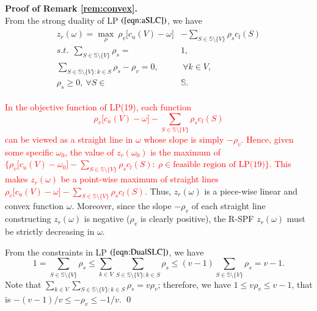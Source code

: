 \documentclass[authoryear,review,12pt]{elsarticle}
\begin{document}
\noindent \textbf{Proof of Remark \ref{rem:convex}.}\\
From the strong duality of LP $(\ref{eqn:aSLC})$, we have
\begin{eqnarray}\label{eqn:DualSLC}
\begin{aligned}
z_r(\omega) = \max_{\rho}~ \rho_v \big[ c_u(V)-\omega \big] &- \sum_{S \in \mathbb{S} \setminus \{V\}} \rho_s c_l(S)\\
s.t.~~\sum_{S \in \mathbb{S} \setminus \{V\}} \rho_s = &1,\\
\sum_{S \in \mathbb{S} \setminus \{V\}: k \in S} \rho_s - \rho_v = 0,&~\forall k \in V,\\
\rho_s \geq 0,~\forall S \in& \mathbb{S}.
\end{aligned}
\end{eqnarray}

\textcolor{red}{
In the objective function of LP(19), each function
$$\rho_v \big[ c_u(V)-\omega \big] - \sum_{S \in \mathbb{S} \setminus \{V\}} \rho_s c_l(S)$$
can be viewed as a straight line in $\omega$ whose slope is simply $-\rho_v$.
Hence, given some specific $\omega_0$, the value of $z_r(\omega_0)$ is the maximum of $\big\{\rho_v \big[ c_u(V)-\omega_0 \big] - \sum_{S \in \mathbb{S} \setminus \{V\}} \rho_s c_l(S):~\rho \in \text{feasible region of LP(19)} \big\}$.
This makes $z_r(\omega)$ be a point-wise maximum of straight lines $\rho_v \big[ c_u(V)-\omega \big] - \sum_{S \in \mathbb{S} \setminus \{V\}} \rho_s c_l(S)$.}
Thus, $z_r(\omega)$ is a piece-wise linear and convex function  $\omega$.
Moreover, since the slope $-\rho_v$ of each straight line constructing $z_r(\omega)$ is negative ($\rho_v$ is clearly positive), the R-SPF $z_r(\omega)$ must be strictly decreasing in $\omega$.

From the constraints in LP $(\ref{eqn:DualSLC})$, we have
$$
1 = \sum_{S \in \mathbb{S} \setminus \{V\}} \rho_s \leq \sum_{k \in V}\sum_{S \in \mathbb{S} \setminus \{V\}: k \in S} \rho_s \leq (v-1)\sum_{S \in \mathbb{S} \setminus \{V\}} \rho_s = v-1.
$$
Note that $\sum_{k \in V}\sum_{S \in \mathbb{S} \setminus \{V\}: k \in S} \rho_s = v\rho_v$; therefore, we have $1 \leq v\rho_v \leq v-1$, that is $-(v-1)/v\leq -\rho_v \leq -1/v$.
\qed
\end{document}
